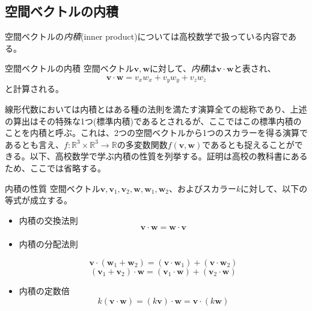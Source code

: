 \subsection{空間ベクトルの内積}
空間ベクトルの\emph{内積}(inner product)については高校数学で扱っている内容である。
\begin{definition*}{空間ベクトルの内積}
	空間ベクトル\(\boldsymbol{v},\boldsymbol{w}\)に対して、\emph{内積}は\(\boldsymbol{v}\cdot\boldsymbol{w}\)と表され、
	\begin{equation}
		\boldsymbol{v}\cdot\boldsymbol{w}= v_x w_x +v_y w_y+ v_z w_z
	\end{equation}
	と計算される。
\end{definition*}
線形代数においては内積とはある種の法則を満たす演算全ての総称であり、上述の算出はその特殊な1つ(標準内積)であるとされるが、ここではこの標準内積のことを内積と呼ぶ。これは、2つの空間ベクトルから1つのスカラーを得る演算であるとも言え、\(f:\mathbb{R}^3\times \mathbb{R}^3 \rightarrow \mathbb{R}\)の多変数関数\(f(\boldsymbol{v},\boldsymbol{w})\)であるとも捉えることができる。以下、高校数学で学ぶ内積の性質を列挙する。証明は高校の教科書にあるため、ここでは省略する。
\begin{theorem*}{内積の性質}
	空間ベクトル\(\boldsymbol{v},\boldsymbol{v}_1,\boldsymbol{v}_2,\boldsymbol{w},\boldsymbol{w}_1,\boldsymbol{w}_2\)、およびスカラー\(k\)に対して、以下の等式が成立する。
	\begin{itemize}
		\item 内積の交換法則
		      \begin{equation}
			      \boldsymbol{v}\cdot \boldsymbol{w}=\boldsymbol{w}\cdot \boldsymbol{v}
		      \end{equation}
		\item 内積の分配法則

		      \begin{equation}
			      \boldsymbol{v}\cdot(\boldsymbol{w}_1+\boldsymbol{w}_2)=  (\boldsymbol{v}\cdot \boldsymbol{w}_1) +  (\boldsymbol{v}\cdot \boldsymbol{w}_2)
		      \end{equation}
		      \begin{equation}
			      (\boldsymbol{v}_1+\boldsymbol{v}_2)\cdot\boldsymbol{w}= (\boldsymbol{v}_1\cdot \boldsymbol{w}) +  (\boldsymbol{v}_2\cdot \boldsymbol{w})
		      \end{equation}

		\item 内積の定数倍
		      \begin{equation}
			      k(\boldsymbol{v}\cdot\boldsymbol{w})= (k\boldsymbol{v})\cdot\boldsymbol{w} = \boldsymbol{v}\cdot(k\boldsymbol{w})
		      \end{equation}
	\end{itemize}
\end{theorem*}
